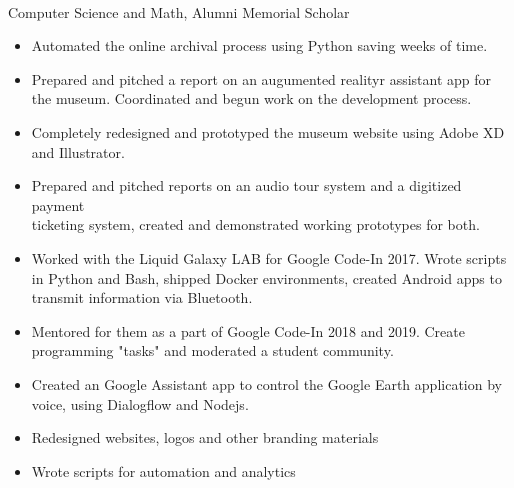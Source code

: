 \documentclass[a4paper]{resume}
\begin{document}
\vspace*{-40pt}


\\Computer Science and Math, Alumni Memorial Scholar

\enresection

\begin{itemize} \vspace{-5pt} \itemsep -2pt
	\item Automated the online archival process using Python saving weeks of time.
	\item Prepared and pitched a report on an augumented realityr assistant app for the museum. Coordinated and begun work on the development process.
	\item Completely redesigned and prototyped the museum website using Adobe XD and Illustrator.
\item Prepared and pitched reports on an audio tour system and a digitized payment\\ticketing system, created and demonstrated working prototypes for both.
\end{itemize}

\begin{itemize} \vspace{-5pt} \itemsep -2pt
	\item Worked with the Liquid Galaxy LAB for Google Code-In 2017. Wrote scripts in Python and Bash, shipped Docker environments, created Android apps to transmit information via Bluetooth.
	\item Mentored for them as a part of Google Code-In 2018 and 2019. Create programming "tasks" and moderated a student community.
	\item Created an Google Assistant app to control the Google Earth application by voice, using Dialogflow and Nodejs.
\end{itemize}

\begin{itemize} \vspace{-5pt} \itemsep -2pt
	\item Redesigned websites, logos and other branding materials
	\item Wrote scripts for automation and analytics
\end{itemize}
\end{document}
